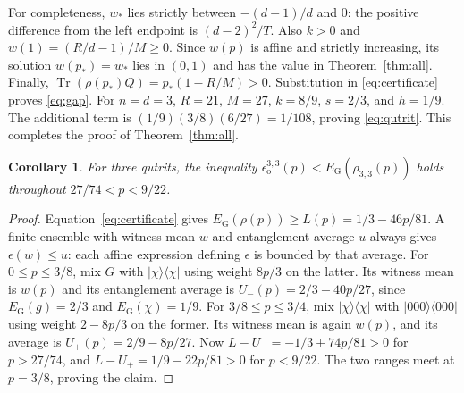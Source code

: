 \documentclass[11pt]{article}
\newtheorem{corollary}{Corollary}
\newcommand{\tr}{\operatorname{Tr}}
\newcommand{\ket}[1]{\lvert #1\rangle}
\newcommand{\bra}[1]{\langle #1\rvert}
\newcommand{\EG}{E_{\mathrm G}}
\newcommand{\eps}{\epsilon_{\mathrm o}}
\begin{document}
For completeness, $w_*$ lies strictly between $-(d-1)/d$ and $0$:
the positive difference from the left endpoint is $(d-2)^2/T$.
Also $k>0$ and $w(1)=(R/d-1)/M\geq0$.
Since $w(p)$ is affine and strictly increasing, its solution $w(p_*)=w_*$
lies in $(0,1)$ and has the value in Theorem~\ref{thm:all}.
Finally, $\tr(\rho(p_*)Q)=p_*(1-R/M)>0$. Substitution in
\eqref{eq:certificate} proves \eqref{eq:gap}.
For $n=d=3$, $R=21$, $M=27$, $k=8/9$, $s=2/3$, and $h=1/9$.
The additional term is $(1/9)(3/8)(6/27)=1/108$, proving
\eqref{eq:qutrit}. This completes the proof of Theorem~\ref{thm:all}.

\begin{corollary}\label{cor:interval}
For three qutrits, the inequality
$\eps^{3,3}(p)<\EG(\rho_{3,3}(p))$ holds throughout
$27/74<p<9/22$.
\end{corollary}
\begin{proof}
Equation~\eqref{eq:certificate} gives
$\EG(\rho(p))\geq L(p)=1/3-46p/81$.
A finite ensemble with witness mean $w$ and entanglement average $u$
always gives $\epsilon(w)\leq u$: each affine expression defining
$\epsilon$ is bounded by that average.
For $0\leq p\leq3/8$, mix $G$ with $\ket\chi\bra\chi$ using weight
$8p/3$ on the latter. Its witness mean is $w(p)$ and its entanglement
average is $U_-(p)=2/3-40p/27$, since $\EG(g)=2/3$ and
$\EG(\chi)=1/9$.
For $3/8\leq p\leq3/4$, mix $\ket\chi\bra\chi$ with
$\ket{000}\bra{000}$ using weight $2-8p/3$ on the former.
Its witness mean is again $w(p)$, and its average is
$U_+(p)=2/9-8p/27$.
Now $L-U_-=-1/3+74p/81>0$ for $p>27/74$, and
$L-U_+=1/9-22p/81>0$ for $p<9/22$.
The two ranges meet at $p=3/8$, proving the claim.
\end{proof}
\end{document}
